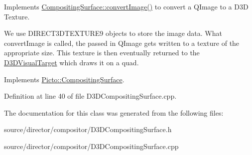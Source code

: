 Implements \hyperlink{struct_picto_1_1_compositing_surface_ae19679a1e4ba977ce0e353ed841fc77e}{Compositing\-Surface\-::convert\-Image()} to convert a Q\-Image to a D3\-D Texture. 

We use D\-I\-R\-E\-C\-T3\-D\-T\-E\-X\-T\-U\-R\-E9 objects to store the image data. What convert\-Image is called, the passed in Q\-Image gets written to a texture of the appropriate size. This texture is then eventually returned to the \hyperlink{class_picto_1_1_d3_d_visual_target}{D3\-D\-Visual\-Target} which draws it on a quad. 

Implements \hyperlink{struct_picto_1_1_compositing_surface_ae19679a1e4ba977ce0e353ed841fc77e}{Picto\-::\-Compositing\-Surface}.



Definition at line 40 of file D3\-D\-Compositing\-Surface.\-cpp.



The documentation for this class was generated from the following files\-:\begin{DoxyCompactItemize}
\item 
source/director/compositor/D3\-D\-Compositing\-Surface.\-h\item 
source/director/compositor/D3\-D\-Compositing\-Surface.\-cpp\end{DoxyCompactItemize}

